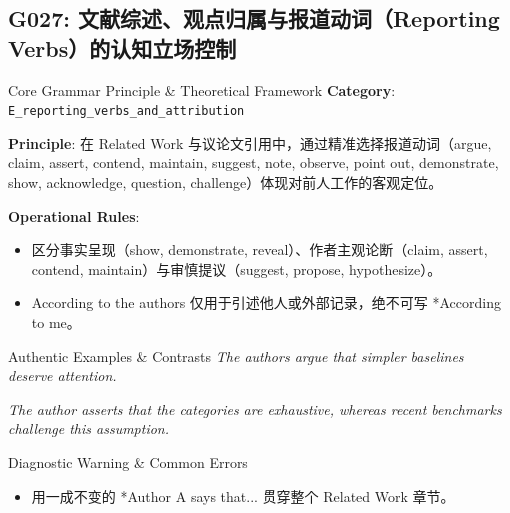 \subsection{G027: 文献综述、观点归属与报道动词（Reporting Verbs）的认知立场控制}\label{sec:rule:G027}
\begin{ConceptBox}{Core Grammar Principle \& Theoretical Framework}
\textbf{Category}: \texttt{E\_reporting\_verbs\_and\_attribution}\par\vspace{3pt}
\textbf{Principle}: 在 Related Work 与议论文引用中，通过精准选择报道动词（argue, claim, assert, contend, maintain, suggest, note, observe, point out, demonstrate, show, acknowledge, question, challenge）体现对前人工作的客观定位。\par\vspace{4pt}
\textbf{Operational Rules}:
\begin{itemize}[leftmargin=1.5em, itemsep=1pt]
  \item 区分事实呈现（show, demonstrate, reveal）、作者主观论断（claim, assert, contend, maintain）与审慎提议（suggest, propose, hypothesize）。
  \item According to the authors 仅用于引述他人或外部记录，绝不可写 *According to me。
\end{itemize}
\end{ConceptBox}
\begin{ExampleBox}{Authentic Examples \& Contrasts}
\textit{The authors argue that simpler baselines deserve attention.}\par\vspace{2pt}
\textit{The author asserts that the categories are exhaustive, whereas recent benchmarks challenge this assumption.}\par\vspace{2pt}
\end{ExampleBox}
\begin{TipBox}{Diagnostic Warning \& Common Errors}
\begin{itemize}[leftmargin=1.5em, itemsep=1pt]
  \item 用一成不变的 *Author A says that... 贯穿整个 Related Work 章节。
\end{itemize}
\end{TipBox}
\vspace{6pt}
